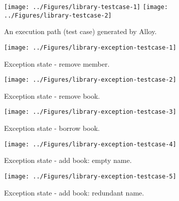 %
%
\begin{figure*}[h]
\centering
{\texttt{[image: ../Figures/library-testcase-1]}%
\label{fig:library-testcase-1}}
\hfil
{\texttt{[image: ../Figures/library-testcase-2]}%
\label{fig:library-testcase-2}}
\caption{An execution path (test case) generated by Alloy.}
\label{fig:library-testcase}
\end{figure*} 

\begin{figure}[h]
\centering
\texttt{[image: ../Figures/library-exception-testcase-1]}%
\caption{Exception state - remove member.}
\label{fig:library-exceptions-testcase-1}
\end{figure} 

\begin{figure}[h]
\centering
\texttt{[image: ../Figures/library-exception-testcase-2]}%
\caption{Exception state - remove book.}
\label{fig:library-exceptions-testcase-2}
\end{figure} 

\begin{figure}[h]
\centering
\texttt{[image: ../Figures/library-exception-testcase-3]}%
\caption{Exception state - borrow book.}
\label{fig:library-exceptions-testcase-3}
\end{figure} 

\begin{figure}[h]
\centering
\texttt{[image: ../Figures/library-exception-testcase-4]}%
\caption{Exception state - add book: empty name.}
\label{fig:library-exceptions-testcase-4}
\end{figure} 

\begin{figure}[h]
\centering
\texttt{[image: ../Figures/library-exception-testcase-5]}%
\caption{Exception state - add book: redundant name.}
\label{fig:library-exceptions-testcase-5}
\end{figure} 

